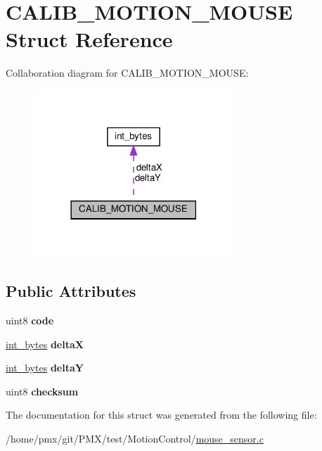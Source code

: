 \hypertarget{structCALIB__MOTION__MOUSE}{}\section{C\+A\+L\+I\+B\+\_\+\+M\+O\+T\+I\+O\+N\+\_\+\+M\+O\+U\+SE Struct Reference}
\label{structCALIB__MOTION__MOUSE}


Collaboration diagram for C\+A\+L\+I\+B\+\_\+\+M\+O\+T\+I\+O\+N\+\_\+\+M\+O\+U\+SE\+:
\nopagebreak
\begin{figure}[H]
\begin{center}
\leavevmode
\includegraphics[width=213pt]{structCALIB__MOTION__MOUSE__coll__graph}
\end{center}
\end{figure}
\subsection*{Public Attributes}
\begin{DoxyCompactItemize}
\item 
\mbox{\label{structCALIB__MOTION__MOUSE_abb726fbb64ca95f72375da2304710f55}} 
uint8 {\bfseries code}
\item 
\mbox{\label{structCALIB__MOTION__MOUSE_aec29451d95783f8ed9eae1725594b6d8}} 
\hyperlink{unionint__bytes}{int\+\_\+bytes} {\bfseries deltaX}
\item 
\mbox{\label{structCALIB__MOTION__MOUSE_a5bf55852ebf47c52dec9c87e0f86c44c}} 
\hyperlink{unionint__bytes}{int\+\_\+bytes} {\bfseries deltaY}
\item 
\mbox{\label{structCALIB__MOTION__MOUSE_a571bd0a4f62b197f125a00a5eb16a98b}} 
uint8 {\bfseries checksum}
\end{DoxyCompactItemize}


The documentation for this struct was generated from the following file\+:\begin{DoxyCompactItemize}
\item 
/home/pmx/git/\+P\+M\+X/test/\+Motion\+Control/\hyperlink{mouse__sensor_8c}{mouse\+\_\+sensor.\+c}\end{DoxyCompactItemize}

